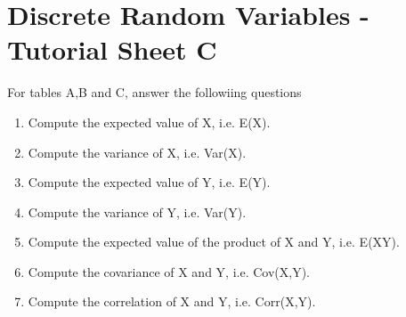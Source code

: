 \documentclass[]{article}
\begin{document}
\section*{Discrete Random Variables - Tutorial Sheet C}
\smallskip

For tables A,B and C, answer the followiing questions

\begin{enumerate}
\item Compute the expected value of X, i.e. E(X).

\item Compute the variance of X, i.e. Var(X).

\item Compute the expected value of Y, i.e. E(Y).

\item  Compute the variance of Y, i.e. Var(Y).

\item  Compute the expected value of the product of X and Y, i.e. E(XY).

\item  Compute the covariance of X and Y, i.e. Cov(X,Y).

\item  Compute the correlation of X and Y, i.e. Corr(X,Y).
\end{enumerate}
\smallskip
\end{document}
